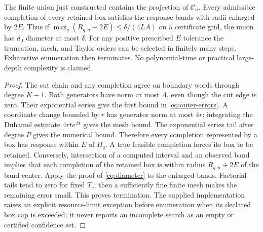 \begin{proposition}
\label{prop:outer}
The finite union just constructed contains the projection of $\mathcal C_n$.
Every admissible completion of every retained box satisfies the response bands
with radii enlarged by $2E$. Thus if $\max_q(R_{q,n}+2E)\le\delta/(4LA)$
on a certificate grid, the union has $d_J$ diameter at most $\delta$.
For any positive prescribed $E$ tolerance the truncation, mesh, and Taylor
orders can be selected in finitely many steps. Exhaustive enumeration then
terminates. No polynomial-time or practical large-depth complexity is claimed.
\end{proposition}
\begin{proof}
The cut chain and any completion agree on boundary words through degree $K-1$.
Both generators have norm at most $\Lambda$, even though the cut edge is zero.
Their exponential series give the first bound in \eqref{eq:outer-errors}.
A coordinate change bounded by $r$ has generator norm at most $4r$; integrating
the Duhamel estimate $4rt e^{\Lambda t}$ gives the mesh bound. The exponential
series tail after degree $P$ gives the numerical bound. Therefore every
completion represented by a box has response within $E$ of $H_q$.
A true feasible completion forces its box to be retained. Conversely,
intersection of a computed interval and an observed band implies that each
completion of the retained box is within radius $R_{q,n}+2E$ of the band
center. Apply the proof of \eqref{eq:diameter} to the enlarged bands.
Factorial tails tend to zero for fixed $T_c$; then a sufficiently fine finite
mesh makes the remaining error small. This proves termination. The supplied
implementation raises an explicit resource-limit exception before enumeration
when its declared box cap is exceeded; it never reports an incomplete search
as an empty or certified confidence set.
\end{proof}

